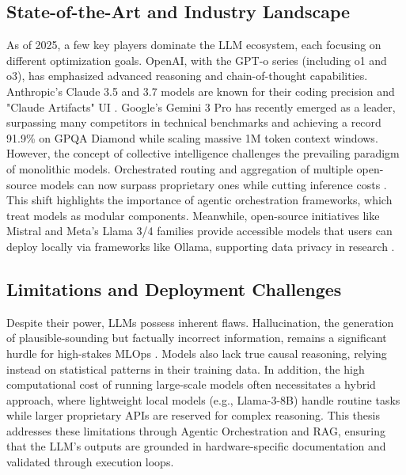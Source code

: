 \subsection{State-of-the-Art and Industry Landscape}
As of 2025, a few key players dominate the LLM ecosystem, each focusing on different optimization goals. OpenAI, with the GPT-o series (including o1 and o3), has emphasized advanced reasoning and chain-of-thought capabilities. Anthropic's Claude 3.5 and 3.7 models are known for their coding precision and "Claude Artifacts" UI \cite{anthropic2025claude}. Google’s Gemini 3 Pro \cite{google2025gemini3} has recently emerged as a leader, surpassing many competitors in technical benchmarks and achieving a record 91.9\% on GPQA Diamond while scaling massive 1M token context windows. However, the concept of collective intelligence challenges the prevailing paradigm of monolithic models. Orchestrated routing and aggregation of multiple open-source models can now surpass proprietary ones while cutting inference costs \cite{tang2026beyond}. This shift highlights the importance of agentic orchestration frameworks, which treat models as modular components. Meanwhile, open-source initiatives like Mistral and Meta’s Llama 3/4 families provide accessible models that users can deploy locally via frameworks like Ollama, supporting data privacy in research \cite{gpt4_technical_report, palm_2022, mistral_7b}.

\subsection{Limitations and Deployment Challenges}
Despite their power, LLMs possess inherent flaws. Hallucination, the generation of plausible-sounding but factually incorrect information, remains a significant hurdle for high-stakes MLOps \cite{limitationsLLM}. Models also lack true causal reasoning, relying instead on statistical patterns in their training data. In addition, the high computational cost of running large-scale models often necessitates a hybrid approach, where lightweight local models (e.g., Llama-3-8B) handle routine tasks while larger proprietary APIs are reserved for complex reasoning. This thesis addresses these limitations through Agentic Orchestration and RAG, ensuring that the LLM's outputs are grounded in hardware-specific documentation and validated through execution loops.
